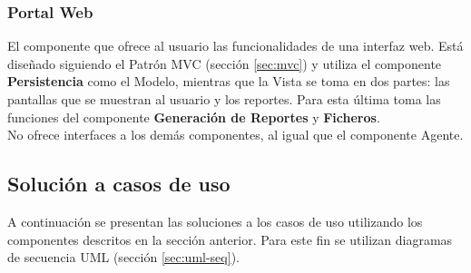 \subsubsection{Portal Web}
El componente que ofrece al usuario las funcionalidades de una interfaz web. Está diseñado siguiendo el Patrón MVC (sección \ref{sec:mvc}) y utiliza el componente \textbf{Persistencia} como el Modelo, mientras que la Vista se toma en dos partes: las pantallas que se muestran al usuario y los reportes. Para esta última toma las funciones del componente \textbf{Generación de Reportes} y \textbf{Ficheros}.\\
No ofrece interfaces a los demás componentes, al igual que el componente Agente.



\subsection{Solución a casos de uso}
A continuación se presentan las soluciones a los casos de uso utilizando los componentes descritos en la sección anterior. Para este fin se utilizan diagramas de secuencia UML (sección \ref{sec:uml-seq}).

